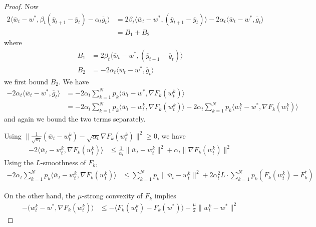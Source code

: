 \begin{proof}
	Now 
	\begin{align*}
	2\langle\overline{w}_{t}-w^{\ast},\beta_{t}(\overline{y}_{t+1}-\overline{y}_{t})-\alpha_{t}\overline{g}_{t}\rangle & =2\beta_{t}\langle\overline{w}_{t}-w^{\ast},(\overline{y}_{t+1}-\overline{y}_{t})\rangle-2\alpha_{t}\langle\overline{w}_{t}-w^{\ast},\overline{g}_{t}\rangle\\
	& =B_{1}+B_{2}
	\end{align*}
	where 
	\begin{align*}
	B_{1} & =2\beta_{t}\langle\overline{w}_{t}-w^{\ast},(\overline{y}_{t+1}-\overline{y}_{t})\rangle\\
	B_{2} & =-2\alpha_{t}\langle\overline{w}_{t}-w^{\ast},\overline{g}_{t}\rangle
	\end{align*}
	we first bound $B_{2}$. We have
	\begin{align*}
	-2\alpha_{t}\langle\overline{w}_{t}-w^{\ast},\overline{g}_{t}\rangle & =-2\alpha_{t}\sum_{k=1}^{N}p_{k}\langle\overline{w}_{t}-w^{\ast},\nabla F_{k}(w_{t}^{k})\rangle\\
	& =-2\alpha_{t}\sum_{k=1}^{N}p_{k}\langle\overline{w}_{t}-w_{t}^{k},\nabla F_{k}(w_{t}^{k})\rangle-2\alpha_{t}\sum_{k=1}^{N}p_{k}\langle w_{t}^{k}-w^{\ast},\nabla F_{k}(w_{t}^{k})\rangle
	\end{align*}
	and again we bound the two terms separately. 
	
	Using $\|\frac{1}{\sqrt{\alpha_{t}}}(\overline{w}_{t}-w_{t}^{k})-\sqrt{\alpha_{t}}\nabla F_{k}(w_{t}^{k})\|^{2}\geq0$,
	we have
	\begin{align*}
	-2\langle\overline{w}_{t}-w_{t}^{k},\nabla F_{k}(w_{t}^{k})\rangle & \leq\frac{1}{\alpha_{t}}\|\overline{w}_{t}-w_{t}^{k}\|^{2}+\alpha_{t}\|\nabla F_{k}(w_{t}^{k})\|^{2}
	\end{align*}
	Using the $L$-smoothness of $F_{k}$,
	\begin{align*}
	-2\alpha_{t}\sum_{k=1}^{N}p_{k}\langle\overline{w}_{t}-w_{t}^{k},\nabla F_{k}(w_{t}^{k})\rangle & \leq\sum_{k=1}^{N}p_{k}\|\overline{w}_{t}-w_{t}^{k}\|^{2}+2\alpha_{t}^{2}L\cdot\sum_{k=1}^{N}p_{k}(F_{k}(w_{t}^{k})-F_{k}^{\ast})
	\end{align*}
	
	On the other hand, the $\mu$-strong convexity of $F_{k}$ implies
	\begin{align*}
	-(w_{t}^{k}-w^{\ast},\nabla F_{k}(w_{t}^{k})\rangle & \leq-\langle F_{k}(w_{t}^{k})-F_{k}(w^{\ast}))-\frac{\mu}{2}\|w_{t}^{k}-w^{\ast}\|^{2}
	\end{align*}
	

\end{proof}
